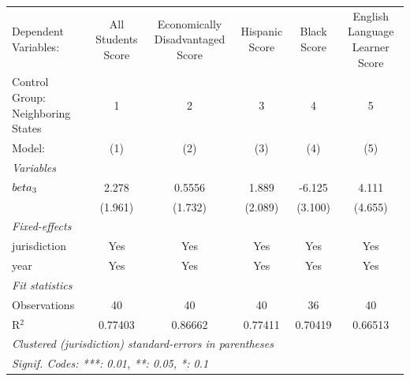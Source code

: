 
\begingroup
\centering
\begin{tabular}{lccccc}
   \tabularnewline \midrule \midrule
   Dependent Variables:              & All Students Score & Economically Disadvantaged Score & Hispanic Score & Black Score & English Language Learner Score\\  
   Control Group: Neighboring States & 1                  & 2                                & 3              & 4           & 5 \\   
   Model:                            & (1)                & (2)                              & (3)            & (4)         & (5)\\  
   \midrule
   \emph{Variables}\\
   $\\beta_3$                        & 2.278              & 0.5556                           & 1.889          & -6.125      & 4.111\\   
                                     & (1.961)            & (1.732)                          & (2.089)        & (3.100)     & (4.655)\\   
   \midrule
   \emph{Fixed-effects}\\
   jurisdiction                      & Yes                & Yes                              & Yes            & Yes         & Yes\\  
   year                              & Yes                & Yes                              & Yes            & Yes         & Yes\\  
   \midrule
   \emph{Fit statistics}\\
   Observations                      & 40                 & 40                               & 40             & 36          & 40\\  
   R$^2$                             & 0.77403            & 0.86662                          & 0.77411        & 0.70419     & 0.66513\\  
   \midrule \midrule
   \multicolumn{6}{l}{\emph{Clustered (jurisdiction) standard-errors in parentheses}}\\
   \multicolumn{6}{l}{\emph{Signif. Codes: ***: 0.01, **: 0.05, *: 0.1}}\\
\end{tabular}
\par\endgroup


